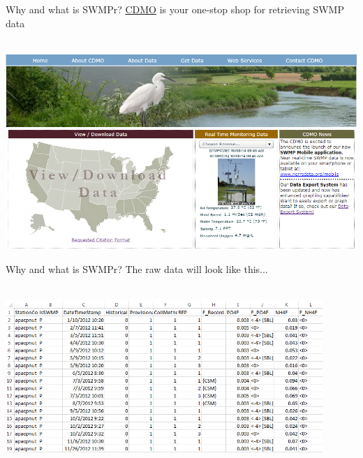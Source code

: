 \documentclass[xcolor=dvipsnames]{beamer}\usepackage[]{graphicx}\usepackage[]{color}
\begin{document}
\begin{frame}[t]{Why and what is SWMPr?}
\href{http://cdmo.baruch.sc.edu/}{CDMO} is your one-stop shop for retrieving SWMP data \\~\\
\centerline{\includegraphics[width = \textwidth]{imgs/cdmo_front.png}}
\end{frame}

\begin{frame}{Why and what is SWMPr?}
The raw data will look like this...\\~\\
\centerline{\includegraphics[width = 0.9\textwidth]{imgs/qaqc_ex.png}}
\end{frame}
\end{document}
